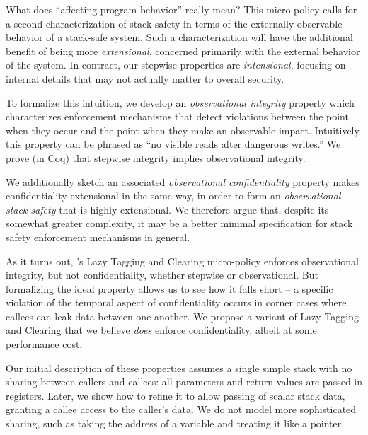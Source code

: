 \documentclass[acmsmall,review,anonymous]{acmart}\settopmatter{printfolios=true,printccs=false,printacmref=false}
\begin{document}
What does ``affecting program behavior'' really mean? This micro-policy
calls for a second characterization of stack safety in terms of the externally
observable behavior of a stack-safe system. Such a characterization will have the
additional benefit of being more {\em extensional}, concerned primarily with the
external behavior of the system. In contract, our stepwise properties are {\em intensional},
focusing on internal details that may not actually matter to overall security.

To formalize this intuition, we develop an \emph{observational integrity} property which
characterizes enforcement mechanisms that detect violations between the point when
they occur and the point when they make an observable impact. Intuitively this property
can be phrased as ``no visible reads after dangerous writes.''  We prove (in Coq) that stepwise
integrity implies observational integrity. 

We additionally sketch an associated {\em observational confidentiality} property
makes confidentiality extensional in the same way, in order to form an
{\em observational stack safety} that is highly extensional.
We therefore argue that, despite its somewhat greater complexity,
it may be a better minimal specification for
stack safety enforcement mechanisms in general.

As it turns out, \citeauthor{DBLP:conf/sp/RoesslerD18}'s Lazy Tagging and
Clearing micro-policy enforces observational integrity, but not confidentiality,
whether stepwise or observational.
But formalizing the ideal property allows us to see how it falls short -- a specific
violation of the temporal aspect of confidentiality occurs in corner cases where callees
can leak data between one another.
We propose  a variant of Lazy Tagging and Clearing that we believe \emph{does} enforce
confidentiality, albeit at some performance cost.

Our initial description of these properties assumes a single simple stack with no sharing
between callers and callees: all parameters and return values are passed in registers.  Later,
we show how to refine it to allow passing of scalar stack data, granting a
callee access to the caller's data. We do not model more sophisticated sharing,
such as taking the address of a variable and treating it like a pointer.
\end{document}
